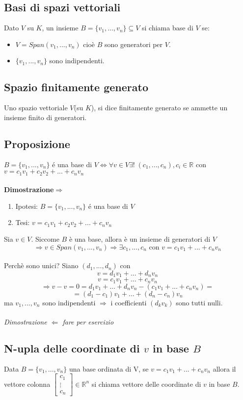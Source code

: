 \subsection{Basi di spazi vettoriali}
Dato \(V\) su \(K\), un insieme \(B=\{v_1,...,v_n\}\subseteq V\) si chiama base di \(V\) se:
\begin{itemize}

	\item \(V=Span(v_1,...,v_n)\) cioè \(B\) sono generatori per \(V\).

	\item \(\{v_1,...,v_n\}\) sono indipendenti.

\end{itemize}

\subsection{Spazio finitamente generato}
Uno spazio vettoriale $V$(su $K$), si dice finitamente generato se ammette un insieme finito di generatori.

\subsection{Proposizione}
$B=\{v_1,...,v_n\}$ é una base di $V\Leftrightarrow \forall v\in V\exists !\;(c_1,...,c_n),c_i\in\mathbb{R}$ con \\$v=c_1v_1+c_2v_2+...+c_nv_n$
\\
\\\textbf{Dimostrazione$\Rightarrow$}
\begin{enumerate}
	\item Ipotesi: $B=\{v_1,...,v_n\}$ é una base di $V$
	\item Tesi: $v=c_1v_1+c_2v_2+...+c_nv_n$
\end{enumerate}
Sia $v\in V$. Siccome $B$ è una base, allora è un insieme di generatori di $V$
\[\Rightarrow v\in Span(v_1,...,v_n)\Rightarrow \exists c_1,...,c_n \text{ con } v=c_1v_1+...+c_nv_n\]
 \\Perchè sono unici? Siano $(d_1,...,d_n)$ con 
 \[v=d_1v_1+...+d_nv_n\]
 \[v=c_1v_1+...+c_nv_n\]
 \[\Rightarrow v-v=0=d_1v_1+...+d_nv_n-(c_1v_1+...+c_nv_n)=\]
 \[=(d_1-c_1)v_1+...+(d_n-c_n)v_n\]
 ma $v_1,...,v_n$ sono indipendenti $\Rightarrow$ i coefficienti $(d_kv_k)$ sono tutti nulli.
 \\
 \\\textit{Dimostrazione $\Leftarrow$ fare per esercizio}

 \subsection{N-upla delle coordinate di $v$ in base $B$}
 Data $B=\{v_1,...,v_n\}$ una base ordinata di V, se $v=c_1v_1+...+c_nv_n$ allora il vettore colonna $\begin{bmatrix}c_1\\\vdots\\c_n\end{bmatrix}\in\mathbb{R}^n$ si chiama vettore delle coordinate di $v$ in base $B$.

